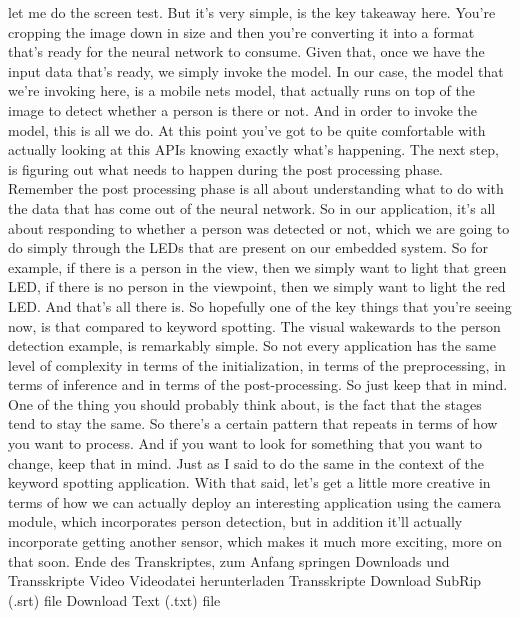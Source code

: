     let me do the screen test.
    But it's very simple, is the key takeaway here.
    You're cropping the image down in size and then
    you're converting it into a format that's ready for the neural network
    to consume.
    Given that, once we have the input data that's ready,
    we simply invoke the model.
    In our case, the model that we're invoking here,
    is a mobile nets model, that actually runs
    on top of the image to detect whether a person is there or not.
    And in order to invoke the model, this is all we do.
    At this point you've got to be quite comfortable with actually
    looking at this APIs knowing exactly what's happening.
    The next step, is figuring out what needs to happen
    during the post processing phase.
    Remember the post processing phase is all about understanding
    what to do with the data that has come out of the neural network.
    So in our application, it's all about responding to
    whether a person was detected or not, which
    we are going to do simply through the LEDs that
    are present on our embedded system.
    So for example, if there is a person in the view,
    then we simply want to light that green LED,
    if there is no person in the viewpoint, then we simply
    want to light the red LED.
    And that's all there is.
    So hopefully one of the key things that you're seeing now,
    is that compared to keyword spotting.
    The visual wakewards to the person detection example,
    is remarkably simple.
    So not every application has the same level of complexity
    in terms of the initialization, in terms of the preprocessing,
    in terms of inference and in terms of the post-processing.
    So just keep that in mind.
    One of the thing you should probably think about,
    is the fact that the stages tend to stay the same.
    So there's a certain pattern that repeats
    in terms of how you want to process.
    And if you want to look for something that you want to change,
    keep that in mind.
    Just as I said to do the same in the context
    of the keyword spotting application.
    With that said, let's get a little more creative
    in terms of how we can actually deploy an interesting application using
    the camera module, which incorporates person detection,
    but in addition it'll actually incorporate
    getting another sensor, which makes it much more exciting, more on that soon.
    Ende des Transkriptes, zum Anfang springen
    Downloads und Transskripte
    Video
    Videodatei herunterladen
    Transskripte
    Download SubRip (.srt) file
    Download Text (.txt) file    
    

